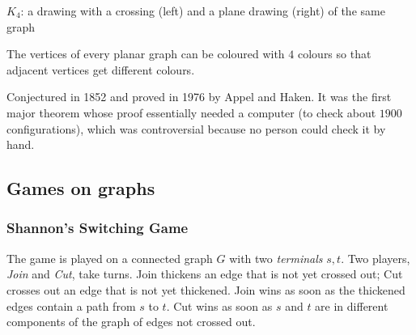 \begin{center}
\qquad
{}
\end{center}
\begin{center}
\small $K_4$: a drawing with a crossing (left) and a plane drawing (right) of the same graph
\end{center}

\begin{theorem}
The vertices of every planar graph can be coloured with $4$ colours so that adjacent vertices get different colours.
\end{theorem}

\begin{note}[History]
Conjectured in 1852 and proved in 1976 by Appel and Haken. It was the first major theorem whose proof essentially needed a computer (to check about $1900$ configurations), which was controversial because no person could check it by hand.
\end{note}

\subsection{Games on graphs}
\label{sec:12-6}

\subsubsection{Shannon's Switching Game}
\label{sec:12-6-1}

\begin{definition}
The game is played on a connected graph $G$ with two \emph{terminals} $s,t$. Two players, \emph{Join} and \emph{Cut}, take turns. Join thickens an edge that is not yet crossed out; Cut crosses out an edge that is not yet thickened. Join wins as soon as the thickened edges contain a path from $s$ to $t$. Cut wins as soon as $s$ and $t$ are in different components of the graph of edges not crossed out.
\end{definition}

